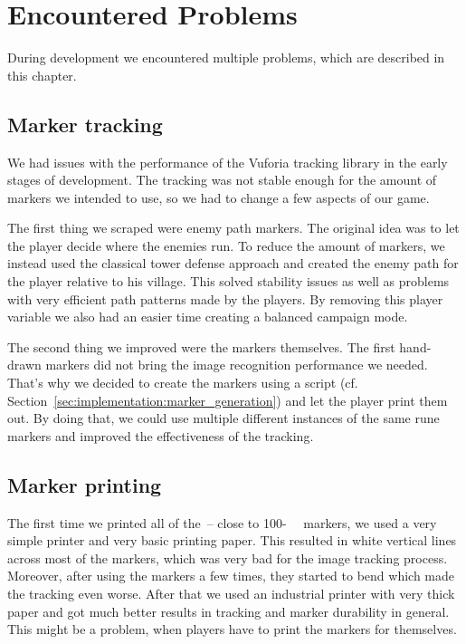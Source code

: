 \section{Encountered Problems}
\label{sec:problems}

During development we encountered multiple problems, which are described in this chapter.

\subsection{Marker tracking}

We had issues with the performance of the Vuforia tracking library in the early stages of development.
The tracking was not stable enough for the amount of markers we intended to use, so we had to change a few aspects of our game.

The first thing we scraped were enemy path markers. The original idea was to let the player decide where the enemies run. To reduce the amount of markers, we instead used the classical tower defense approach and created the enemy path for the player relative to his village.
This solved stability issues as well as problems with very efficient path patterns made by the players.
By removing this player variable we also had an easier time creating a balanced campaign mode.

The second thing we improved were the markers themselves. The first hand-drawn markers did not bring the image recognition performance we needed. That's why we decided to create the markers using a script (cf. Section~\ref{sec:implementation:marker_generation}) and let the player print them out.
By doing that, we could use multiple different instances of the same rune markers and improved the effectiveness of the tracking.

\subsection{Marker printing}

The first time we printed all of the~-- close to 100-~~ markers, we used a very simple printer and very basic printing paper.
This resulted in white vertical lines across most of the markers, which was very bad for the image tracking process. 
Moreover, after using the markers a few times, they started to bend which made the tracking even worse.
After that we used an industrial printer with very thick paper and got much better results in tracking and marker durability in general.
This might be a problem, when players have to print the markers for themselves.

